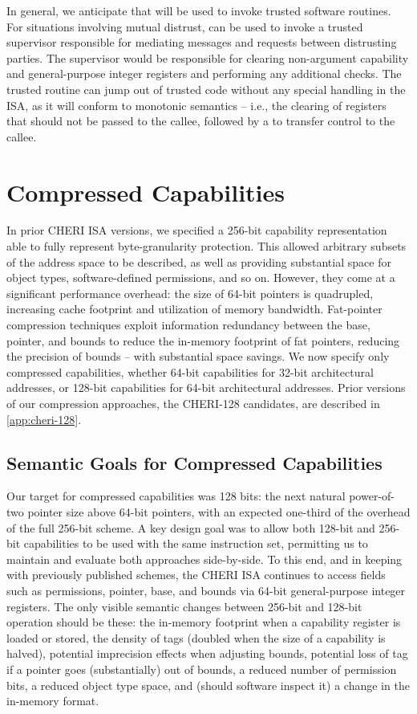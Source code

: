 In general, we anticipate that  will be used
to invoke trusted software routines.  For situations involving
mutual distrust,  can be used to invoke
a trusted supervisor responsible for mediating messages and
requests between distrusting parties.  The supervisor would be
responsible for clearing non-argument capability and general-purpose
integer registers and performing any additional checks.
The  trusted
routine can jump out of trusted code without
any special handling in the ISA, as it will conform to monotonic
semantics -- i.e., the clearing of registers that should not be passed to the
callee, followed by a  to transfer control to the callee.

\section{Compressed Capabilities}
\label{sec:rational:comressed}
In prior CHERI ISA versions, we specified a 256-bit capability
representation able to fully represent byte-granularity protection.
This allowed arbitrary subsets of the address space to be described, as well as
providing substantial
space for object types, software-defined permissions, and so on.
However, they come at a significant performance overhead: the size of 64-bit
pointers is quadrupled, increasing cache footprint and utilization of memory
bandwidth.
Fat-pointer compression techniques exploit information redundancy between the
base, pointer, and bounds to reduce the in-memory footprint of fat pointers,
reducing the precision of bounds -- with substantial space savings.
We now specify only compressed capabilities, whether 64-bit capabilities for
32-bit architectural addresses, or 128-bit capabilities for 64-bit
architectural addresses.
Prior versions of our compression approaches, the CHERI-128 candidates, are
described in \cref{app:cheri-128}.

\subsection{Semantic Goals for Compressed Capabilities}

Our target for compressed capabilities was 128 bits: the next natural
power-of-two pointer size above 64-bit pointers, with an expected one-third of
the overhead of the full 256-bit scheme.
A key design goal was to allow both 128-bit and 256-bit capabilities to be
used with the same instruction set, permitting us to maintain and evaluate
both approaches side-by-side.
To this end, and in keeping with previously published schemes, the CHERI ISA
continues to access fields such as permissions, pointer, base, and bounds via
64-bit general-purpose integer registers.
The only visible semantic changes between 256-bit and 128-bit operation should
be these:
the in-memory footprint when a capability register is loaded or stored,
the density of tags (doubled when the size of a capability is halved),
potential imprecision effects when adjusting bounds, potential loss of tag if
a pointer goes (substantially) out of bounds, a reduced number of permission
bits, a reduced object type space, and (should software inspect it) a change
in the in-memory format.

